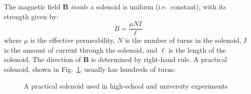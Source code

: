 \begin{figure}[ht]
  \centering
\end{figure}
The magnetic field $\bm B$ \emph{inside} a solenoid is uniform (i.e.\
constant), with its strength given by:
\begin{equation}
  \boxed{B=\frac{\mu NI}\ell}
\end{equation}
where $\mu$ is the effective permeability, $N$ is the number of turns in the
solenoid, $I$ is the amount of current through the solenoid, and $\ell$ is the
length of the solenoid. The direction of $\bm B$ is determined by right-hand
rule.
%  
%
%
%
%
A practical solenoid, shown in Fig.~\ref{fig:practical-solenoid}, usually has
hundreds of turns:
\begin{figure}[ht]
  \centering
  \caption{A practical solenoid used in high-school and university experiments}
  \label{fig:practical-solenoid}
\end{figure}

